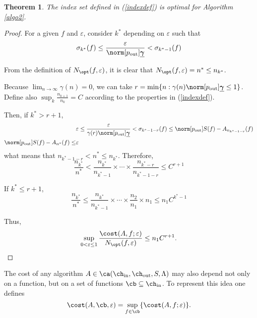 \documentclass[final]{elsarticle}
\newcommand{\chin}{\ch_{\text{\rm{in}}}}
\newcommand{\chout}{\ch_{\text{\rm{out}}}}
\newcommand{\pout}{p_{\text{\rm{out}}}}
\newcommand{\bgamma}{\underline{\boldsymbol\gamma}}
\newtheorem{theorem}{Theorem}
\theoremstyle{definition}
\theoremstyle{remark}
\begin{document}
\begin{theorem}\label{nopt}
The index set defined in (\ref{indexdef}) is optimal for Algorithm \ref{algo2}.
\end{theorem}
\begin{proof}
For a given $f$ and $\varepsilon$, consider $k^*$ depending on $\varepsilon$ such that
\begin{equation*}
\sigma_{k^*}(f) \le \frac{\varepsilon}{\norm[\pout]{\bgamma}} < \sigma_{k^*-1}(f)
\end{equation*}

From the definition of $N_{\opt}(f,\varepsilon)$, it is clear that $N_{\opt}(f,\varepsilon)=n^*\le n_{k^*}$.

Because $\lim_{n\rightarrow\infty}\gamma(n)=0$, we can take $r=\min\{n: \gamma(n)\norm[\pout]{\bgamma} \le 1\}$. Define also $\sup_k\frac{n_{k+1}}{n_k}=C$ according to the properties in (\ref{indexdef}).

Then, if $k^*>r+1$,
\begin{align*}
& \varepsilon \le \frac{\varepsilon}{\gamma(r)\norm[\pout]{\bgamma}} < \sigma_{k^*-1-r}(f) \le \norm[\pout]{S(f)-A_{n_{k^*-1-r}}(f)} \\
\norm[\pout]{S(f)-A_{n^*}(f)} \le & \varepsilon
\end{align*}
what means that $n_{k^*-1-r} < n^* \le n_{k^*}$. Therefore,
\begin{equation*}
\frac{n_{k^*}}{n^*} < \frac{n_{k^*}}{n_{k^*-1}}\times\cdots\times\frac{n_{k^*-r}}{n_{k^*-1-r}} \le C^{r+1}
\end{equation*}

If $k^* \le r+1$,
\begin{equation*}
\frac{n_{k^*}}{n^*} \le \frac{n_{k^*}}{n_{k^*-1}}\times\cdots\times\frac{n_{2}}{n_{1}}\times n_{1} \le n_{1}C^{k^*-1}
\end{equation*}

Thus,
\begin{equation*}
\sup_{0 < \varepsilon \le 1} \frac{\cost(A,f;\varepsilon)} {N_{\opt}(f,\varepsilon)} \le n_1C^{r+1}.
\end{equation*}
\end{proof}

The cost of any algorithm $A\in\ca(\chin,\chout,S,\Lambda)$ may also depend not only on a function, but on a set of functions $\cb\subseteq\chin$. To represent this idea one defines
\begin{equation*}
\cost(A,\cb,\varepsilon)=\sup_{f\in\cb}\{\cost(A,f;\varepsilon)\}.
\end{equation*}
\end{document}
